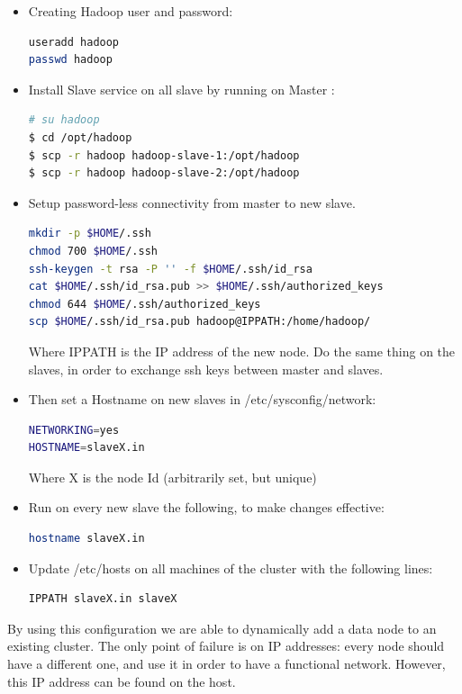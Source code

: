\documentclass[11pt]{report} %
\begin{document}
\begin{itemize}
\item Creating Hadoop user and password: 

\begin{lstlisting}[language=bash]
useradd hadoop
passwd hadoop
\end{lstlisting}

\item Install Slave service on all slave by running on Master :
\begin{lstlisting}[language=bash]
# su hadoop 
$ cd /opt/hadoop 
$ scp -r hadoop hadoop-slave-1:/opt/hadoop 
$ scp -r hadoop hadoop-slave-2:/opt/hadoop
\end{lstlisting}
\item Setup password-less connectivity from master to new slave.
\begin{lstlisting}[language=bash]
mkdir -p $HOME/.ssh 
chmod 700 $HOME/.ssh 
ssh-keygen -t rsa -P '' -f $HOME/.ssh/id_rsa 
cat $HOME/.ssh/id_rsa.pub >> $HOME/.ssh/authorized_keys 
chmod 644 $HOME/.ssh/authorized_keys
scp $HOME/.ssh/id_rsa.pub hadoop@IPPATH:/home/hadoop/
\end{lstlisting}
Where IPPATH is the IP address of the new node.
Do the same thing on the slaves, in order to exchange ssh keys between master and slaves.

\item Then set a Hostname on new slaves in  /etc/sysconfig/network:
\begin{lstlisting}[language=bash]
NETWORKING=yes 
HOSTNAME=slaveX.in
\end{lstlisting}
Where X is the node Id (arbitrarily set, but unique)

\item Run on every new slave the following, to make changes effective: 
\begin{lstlisting}[language=bash]
hostname slaveX.in
\end{lstlisting}

\item Update /etc/hosts on all machines of the cluster with the following lines:
\begin{lstlisting}[language=bash]
IPPATH slaveX.in slaveX
\end{lstlisting}
\end{itemize}
By using this configuration we are able to dynamically add a data node to an existing cluster. The only point of failure is on IP addresses: every node should have a different one, and use it in order to have a functional network. However, this IP address can be found on the host.
\end{document}
